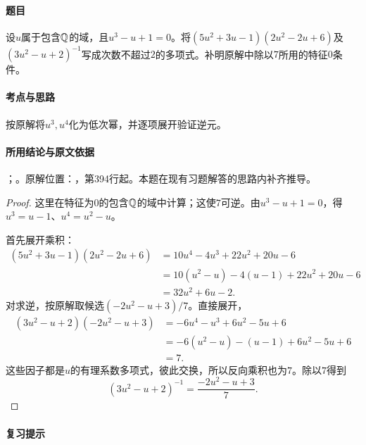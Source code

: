 \label{ex:3:36}

\paragraph{题目}

设$u$属于包含$\mathbb Q$的域，且$u^3-u+1=0$。将$(5u^2+3u-1)(2u^2-2u+6)$及$(3u^2-u+2)^{-1}$写成次数不超过$2$的多项式。补明原解中除以$7$所用的特征$0$条件。

\paragraph{考点与思路}

按原解将$u^3,u^4$化为低次幂，并逐项展开验证逆元。

\paragraph{所用结论与原文依据}

；。原解位置：，第394行起。本题在现有习题解答的思路内补齐推导。


\begin{proof}

这里在特征为$0$的包含$\mathbb Q$的域中计算；这使$7$可逆。由$u^3-u+1=0$，得$u^3=u-1$、$u^4=u^2-u$。

首先展开乘积：
\begin{align*}
(5u^2+3u-1)(2u^2-2u+6)
&=10u^4-4u^3+22u^2+20u-6\\
&=10(u^2-u)-4(u-1)+22u^2+20u-6\\
&=32u^2+6u-2.
\end{align*}
对求逆，按原解取候选$(-2u^2-u+3)/7$。直接展开，
\begin{align*}
(3u^2-u+2)(-2u^2-u+3)
&=-6u^4-u^3+6u^2-5u+6\\
&=-6(u^2-u)-(u-1)+6u^2-5u+6\\
&=7.
\end{align*}
这些因子都是$u$的有理系数多项式，彼此交换，所以反向乘积也为$7$。除以$7$得到
\[
(3u^2-u+2)^{-1}=\frac{-2u^2-u+3}{7}.
\]

\end{proof}

\paragraph{复习提示}

